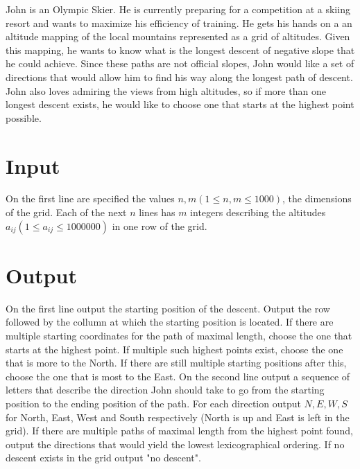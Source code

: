 
John is an Olympic Skier. He is currently preparing for a competition at a skiing resort and wants to maximize his efficiency of training. He gets his hands on a an altitude mapping of the local mountains represented as a grid of altitudes. Given this mapping, he wants to know what is the longest descent of negative slope that he could achieve. Since these paths are not official slopes, John would like a set of directions that would allow him to find his way along the longest path of descent. John also loves admiring the views from high altitudes, so if more than one longest descent exists, he would like to choose one that starts at the highest point possible.


\section*{Input}
On the first line are specified the values $n, m (1 \leq n, m \leq 1000)$, the dimensions of the grid.
Each of the next $n$ lines has $m$ integers describing the altitudes $a_{ij} (1 \leq a_{ij} \leq 1000000)$ in one row of the grid.

\section*{Output}
On the first line output the starting position of the descent. Output the row followed by the collumn at which the starting position is located. If there are multiple starting coordinates for the path of maximal length, choose the one that starts at the highest point. If multiple such highest points exist, choose the one that is more to the North. If there are still multiple starting positions after this, choose the one that is most to the East.
On the second line output a sequence of letters that describe the direction John should take to go from the starting position to the ending position of the path. For each direction output $N, E, W, S$ for North, East, West and South respectively (North is up and East is left in the grid). If there are multiple paths of maximal length from the highest point found, output the directions that would yield the lowest lexicographical ordering.
If no descent exists in the grid output "no descent".
